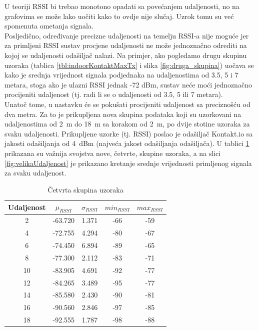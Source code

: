 U teoriji RSSI bi trebao monotono opadati sa povećanjem udaljenosti, no na grafovima se može lako uočiti kako to ovdje nije slučaj. 
Uzrok tomu su već spomenuta ometanja signala.
\\
Posljedično, određivanje precizne udaljenosti na temelju RSSI-a nije moguće jer za primljeni RSSI sustav procjene udaljenosti ne može jednoznačno odrediti na kojoj se udaljenosti odašiljač nalazi. 
Na primjer, ako pogledamo drugu skupinu uzoraka (tablica \ref{tbl:indoorKontaktMaxTx} i slika \ref{fig:druga_skupina}) uočava se kako je srednja vrijednost signala podjednaka na udaljenostima od 3.5, 5 i 7 metara, stoga ako je ulazni RSSI jednak -72 dBm, sustav neće moći jednoznačno procijeniti udaljenost (tj. radi li se o udaljenosti od 3.5, 5 ili 7 metara).
\\

Unatoč tome, u nastavku će se pokušati procijeniti udaljenost sa preciznošću od dva metra. 
Za to je prikupljena nova skupina podataka koji su uzorkovani na udaljenostima od \SI{2}{m} do \SI{18}{m} sa korakom od \SI{2}{m}, po dvije stotine uzoraka za svaku udaljenosti. 
Prikupljene uzorke (tj. RSSI) poslao je odašiljač Kontakt.io sa jakosti odašiljanja od \SI{4}{dBm} (najveća jakost odašiljanja odašiljača). 
U tablici \ref{tbl:velikaUdaljenost} prikazana su važnija svojstva nove, četvrte, skupine uzoraka, a na slici \ref{fig:velikaUdaljenost} je prikazano kretanje srednje vrijednosti primljenog signala za svaku udaljenost.

\begin{table}[H]
    \centering
    \caption{Četvrta skupina uzoraka}
    \label{tbl:velikaUdaljenost}
    \small
    \begin{tabular}{ccccc}
    \hline 
    Udaljenost & $\mu_{RSSI}$ & $\sigma_{RSSI}$ & $min_{RSSI}$ & $max_{RSSI}$ \\ 
    \hline 
    2 & -63.720 & 1.371 & -66 & -59 \\ 
    4 & -72.755 & 4.294 & -80 & -67 \\ 
    6 & -74.450 & 6.894 & -89 & -65 \\ 
    8 & -77.300 & 2.112 & -83 & -71 \\ 
    10 & -83.905 & 4.691 & -92 & -77 \\ 
    12 & -84.265 & 3.489 & -95 & -77 \\ 
    14 & -85.580 & 2.430 & -90 & -81 \\ 
    16 & -90.560 & 2.846 & -97 & -85 \\ 
    18 & -92.555 & 1.787 & -98 & -88 \\ 
    \hline 
    \end{tabular} 
\end{table}

